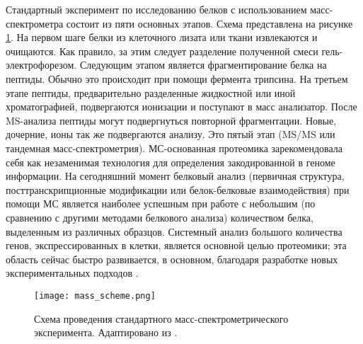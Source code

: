 Стандартный эксперимент по исследованию белков с использованием масс-спектрометра состоит из пяти основных этапов. Схема представлена на рисунке \ref{mass_scheme}. На первом шаге белки из клеточного лизата или ткани извлекаются и очищаются. Как правило, за этим следует разделение полученной смеси гель-электрофорезом. Следующим этапом является фрагментирование белка на пептиды. Обычно это происходит при помощи фермента трипсина. На третьем этапе пептиды, предварительно разделенные жидкостной или иной хроматографией, подвергаются ионизации и поступают в масс анализатор. После MS-анализа пептиды могут подвергнуться повторной фрагментации. Новые, дочерние, ионы так же подвергаются анализу. Это пятый этап (MS/MS или тандемная масс-спектрометрия). МС-основанная протеомика зарекомендовала себя как незаменимая технология для определения закодированной в геноме информации. На сегодняшний момент белковый анализ (первичная структура, посттранскрипционные модификации или белок-белковые взаимодействия) при помощи МС является наиболее успешным при работе с небольшим (по сравнению с другими методами белкового анализа) количеством белка, выделенным из различных образцов. Системный анализ большого количества генов, экспрессированных в клетки, является основной целью протеомики; эта область сейчас быстро развивается, в основном, благодаря разработке новых экспериментальных подходов \cite{aebersold2003mass}.

\begin{figure}[ph!]
    \begin{center}
        \texttt{[image: mass\_scheme.png]}
    \end{center}
\caption[foo bar]{Схема проведения стандартного масс-спектрометрического эксперимента. Адаптировано из \cite{aebersold2003mass}.}
\label{mass_scheme}
\end{figure}


